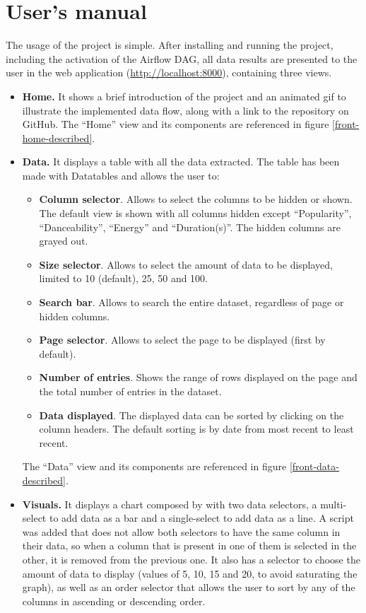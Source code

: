 \section{User's manual} \label{usermanual}

\nonzeroparskip The usage of the project is simple. After installing and running the project, including the activation of the Airflow DAG, all data results are presented to the user in the web application (\url{http://localhost:8000}), containing three views.
\begin{itemize}
	 \item \textbf{Home.} It shows a brief introduction of the project and an animated gif to illustrate the implemented data flow, along with a link to the repository on GitHub. The ``Home'' view and its components are referenced in figure \ref{front-home-described}.
	 \item \textbf{Data.} It displays a table with all the data extracted. The table has been made with Datatables and allows the user to:
	 \begin{itemize}
	 	\item \textbf{Column selector}. Allows to select the columns to be hidden or shown. The default view is shown with all columns hidden except ``Popularity'', ``Danceability'', ``Energy'' and ``Duration(s)''. The hidden columns are grayed out.
	 	\item \textbf{Size selector}. Allows to select the amount of data to be displayed, limited to 10 (default), 25, 50 and 100.
	 	\item \textbf{Search bar}. Allows to search the entire dataset, regardless of page or hidden columns.
	 	\item \textbf{Page selector}. Allows to select the page to be displayed (first by default).
	 	\item \textbf{Number of entries}. Shows the range of rows displayed on the page and the total number of entries in the dataset.
	 	\item \textbf{Data displayed}. The displayed data can be sorted by clicking on the column headers. The default sorting is by date from most recent to least recent.
	 \end{itemize}
	 The ``Data'' view and its components are referenced in figure \ref{front-data-described}.
	 \item \textbf{Visuals.} It displays a chart composed by 
	 with two data selectors, a multi-select to add data as a bar and a single-select to add data as a line. A script was added that does not allow both selectors to have the same column in their data, so when a column that is present in one of them is selected in the other, it is removed from the previous one. It also has a selector to choose the amount of data to display (values of 5, 10, 15 and 20, to avoid saturating the graph), as well as an order selector that allows the user to sort by any of the columns in ascending or descending order.

\end{itemize}
